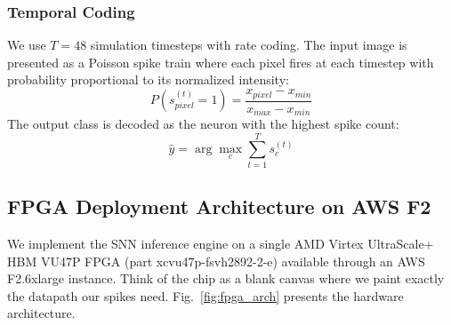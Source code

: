 \documentclass[11pt,a4paper]{article}
\begin{document}
\subsubsection{Temporal Coding}
We use $T = 48$ simulation timesteps with rate coding. The input image is presented as a Poisson spike train where each pixel fires at each timestep with probability proportional to its normalized intensity:
\begin{equation}
    P(s_{pixel}^{(t)} = 1) = \frac{x_{pixel} - x_{min}}{x_{max} - x_{min}}
\end{equation}
The output class is decoded as the neuron with the highest spike count:
\begin{equation}
    \hat{y} = \arg\max_c \sum_{t=1}^{T} s_c^{(t)}
\end{equation}

\subsection{FPGA Deployment Architecture on AWS F2}\label{sec:fpga}

We implement the SNN inference engine on a single AMD Virtex UltraScale+ HBM VU47P FPGA (part xcvu47p-fsvh2892-2-e) available through an AWS F2.6xlarge instance. Think of the chip as a blank canvas where we paint exactly the datapath our spikes need. Fig.~\ref{fig:fpga_arch} presents the hardware architecture.
\end{document}
